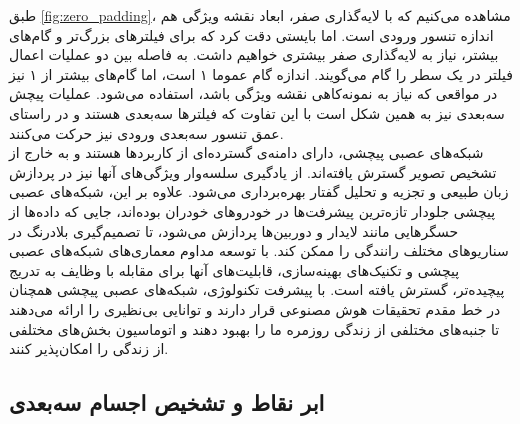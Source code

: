 طبق \cref{fig:zero_padding}، مشاهده می‌کنیم که با لایه‌گذاری صفر، ابعاد نقشه ویژگی هم اندازه تنسور ورودی است. اما بایستی دقت کرد که برای فیلتر‌های بزرگ‌تر و گام‌های بیشتر، نیاز به لایه‌گذاری صفر بیشتری خواهیم داشت. به فاصله بین دو عملیات اعمال فیلتر در یک سطر را گام می‌گویند. اندازه گام عموما ۱ است، اما گام‌های بیشتر از ۱ نیز در مواقعی که نیاز به نمونه‌کاهی نقشه ویژگی باشد، استفاده می‌شود. عملیات پیچش سه‌بعدی نیز به همین شکل است با این تفاوت که فیلترها سه‌بعدی هستند و در راستای عمق تنسور سه‌بعدی ورودی نیز حرکت می‌کنند.
\\
شبکه‌های عصبی پیچشی، دارای دامنه‌ی گسترده‌ای از کاربردها هستند و به خارج از تشخیص تصویر گسترش یافته‌اند. از یادگیری سلسه‌وار ویژگی‌های آنها نیز در پردازش زبان طبیعی و تجزیه و تحلیل گفتار بهره‌برداری می‌شود. علاوه بر این، شبکه‌های عصبی پیچشی جلو‌دار تازه‌ترین پیشرفت‌ها در خودروهای خودران بوده‌اند، جایی که داده‌ها از حسگرهایی مانند لایدار و دوربین‌ها پردازش می‌شود، تا تصمیم‌گیری بلادرنگ در سناریو‌های مختلف رانندگی را ممکن کند. با توسعه مداوم معماری‌های شبکه‌های عصبی پیچشی و تکنیک‌های بهینه‌سازی، قابلیت‌های آنها برای مقابله با وظایف به تدریج پیچیده‌تر، گسترش یافته است. با پیشرفت تکنولوژی، شبکه‌های عصبی پیچشی همچنان در خط مقدم تحقیقات هوش مصنوعی قرار دارند و توانایی بی‌نظیری را ارائه می‌دهند تا جنبه‌های مختلفی از زندگی روزمره ما را بهبود دهند و اتوماسیون بخش‌های مختلفی از زندگی را امکان‌پذیر کنند.

\subsection{ابر نقاط و تشخیص اجسام سه‌بعدی}

